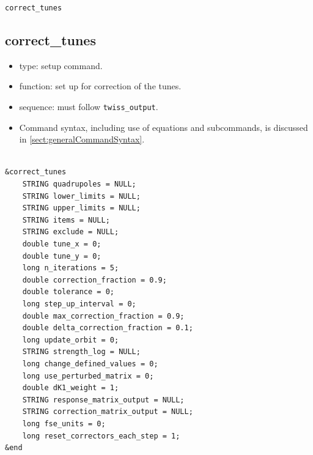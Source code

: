 \documentclass[11pt]{article}
\begin{document}
\newpage
\begin{center}{\Large\verb|correct_tunes|}\end{center}
\subsection{correct\_tunes \label{subsec:correcttunes}}

\begin{itemize}
\item type: setup command.
\item function: set up for correction of the tunes.
\item sequence: must follow \verb|twiss_output|.
\item Command syntax, including use of equations and subcommands, is discussed in \ref{sect:generalCommandSyntax}.
\end{itemize}

\begin{verbatim}

&correct_tunes
    STRING quadrupoles = NULL;
    STRING lower_limits = NULL;
    STRING upper_limits = NULL;
    STRING items = NULL;
    STRING exclude = NULL;
    double tune_x = 0;
    double tune_y = 0;
    long n_iterations = 5;
    double correction_fraction = 0.9;
    double tolerance = 0;
    long step_up_interval = 0;
    double max_correction_fraction = 0.9;
    double delta_correction_fraction = 0.1;
    long update_orbit = 0;
    STRING strength_log = NULL;
    long change_defined_values = 0;
    long use_perturbed_matrix = 0;
    double dK1_weight = 1;
    STRING response_matrix_output = NULL;
    STRING correction_matrix_output = NULL;
    long fse_units = 0;
    long reset_correctors_each_step = 1;
&end
\end{verbatim}
\end{document}
